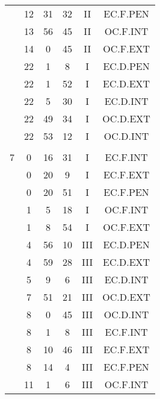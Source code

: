 \documentclass[12pt, a4paper]{article}
\begin{document}
\begin{multicols}{3}
{\begin{tabular}{c c c c c c}
	 	 	 	 & 12 & 31 & 32 & II & EC.F.PEN\\%
	 	 	 	 & 13 & 56 & 45 & II & OC.F.INT\\%
	 	 	 	 & 14 & 0 & 45 & II & OC.F.EXT\\%
	 	 	 	 & 22 & 1 & 8 & I & EC.D.PEN\\%
	 	 	 	 & 22 & 1 & 52 & I & EC.D.EXT\\%
	 	 	 	 & 22 & 5 & 30 & I & EC.D.INT\\%
	 	 	 	 & 22 & 49 & 34 & I & OC.D.EXT\\%
	 	 	 	 & 22 & 53 & 12 & I & OC.D.INT\\%
	 	 	 	 & & & & & \\%
	 	 	 	7 & 0 & 16 & 31 & I & EC.F.INT\\%
	 	 	 	 & 0 & 20 & 9 & I & EC.F.EXT\\%
	 	 	 	 & 0 & 20 & 51 & I & EC.F.PEN\\%
	 	 	 	 & 1 & 5 & 18 & I & OC.F.INT\\%
	 	 	 	 & 1 & 8 & 54 & I & OC.F.EXT\\%
	 	 	 	 & 4 & 56 & 10 & III & EC.D.PEN\\%
	 	 	 	 & 4 & 59 & 28 & III & EC.D.EXT\\%
	 	 	 	 & 5 & 9 & 6 & III & EC.D.INT\\%
	 	 	 	 & 7 & 51 & 21 & III & OC.D.EXT\\%
	 	 	 	 & 8 & 0 & 45 & III & OC.D.INT\\%
	 	 	 	 & 8 & 1 & 8 & III & EC.F.INT\\%
	 	 	 	 & 8 & 10 & 46 & III & EC.F.EXT\\%
	 	 	 	 & 8 & 14 & 4 & III & EC.F.PEN\\%
	 	 	 	 & 11 & 1 & 6 & III & OC.F.INT\\%

\end{tabular}}
\end{multicols}
\end{document}
